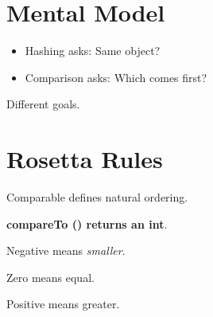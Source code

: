 \documentclass[11pt,a4paper]{book}
\begin{document}
\section{Mental Model}
\begin{itemize}
\item Hashing asks:
Same object?
\item Comparison asks:
Which comes first?
\end{itemize}
Different goals.

\section{Rosetta Rules}

\begin{rosettarule}

Comparable defines natural ordering.

\end{rosettarule}


\begin{rosettarule}

\textbf{compareTo () returns an int}.

\end{rosettarule}


\begin{rosettarule}

\textcolor{RosettaOrange}{Negative} means \emph{smaller}.

\end{rosettarule}


\begin{rosettarule}

Zero means equal.

\end{rosettarule}


\begin{rosettarule}

\textcolor{RosettaDeepGreen}{Positive} means greater.

\end{rosettarule}
\end{document}
